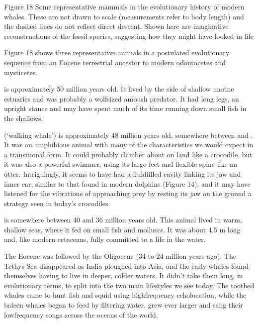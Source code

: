 \documentclass[letterpaper,10pt,english]{sphinxmanual}
\let\sphinxpxdimen\pdfpxdimen\else\newdimen\sphinxpxdimen
\begin{document}
\sphinxincludegraphics[width=780\sphinxpxdimen,height=889\sphinxpxdimen]{{s182_11_figure_16}.jpg}

Figure 18 Some representative mammals in the evolutionary history of modern whales. These are not drawn to scale (measurements refer to body length) and the dashed lines do not reflect direct descent. Shown here are imaginative reconstructions of the fossil species, suggesting how they might have looked in life

Figure 18 shows three representative animals in a postulated evolutionary sequence from an Eocene terrestrial ancestor to modern odontocetes and mysticetes.

 is approximately 50 million years old. It lived by the side of shallow marine estuaries and was probably a wolf\sphinxhyphen{}sized ambush predator. It had long legs, an upright stance and may have spent much of its time running down small fish in the shallows.

 (‘walking whale’) is approximately 48 million years old, somewhere between  and . It was an amphibious animal with many of the characteristics we would expect in a transitional form. It could probably clamber about on land like a crocodile, but it was also a powerful swimmer, using its large feet and flexible spine like an otter. Intriguingly, it seems to have had a fluid\sphinxhyphen{}filled cavity linking its jaw and inner ear, similar to that found in modern dolphins
(Figure 14), and it may have listened for the vibrations of approaching prey by resting its jaw on the ground \textendash{} a strategy seen in today’s crocodiles.

 is somewhere between 40 and 36 million years old. This animal lived in warm, shallow seas, where it fed on small fish and molluscs. It was about 4.5 m long and, like modern cetaceans, fully committed to a life in the water.

The Eocene was followed by the Oligocene (34 to 24 million years ago). The Tethys Sea disappeared as India ploughed into Asia, and the early whales found themselves having to live in deeper, colder waters. It didn’t take them long, in evolutionary terms, to split into the two main lifestyles we see today. The toothed whales came to hunt fish and squid using high\sphinxhyphen{}frequency echolocation, while the baleen whales began to feed by filtering water, grew ever larger and sang their low\sphinxhyphen{}frequency songs
across the oceans of the world.
\end{document}
